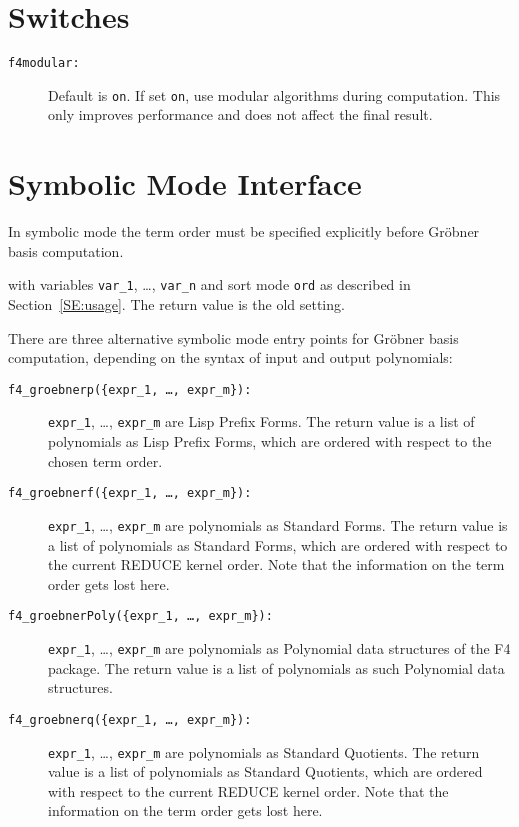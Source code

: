 \documentclass{article}
\newcommand{\grobner}{Gr\"obner}
\newcommand{\code}[1]{\texttt{#1}}
\begin{document}
\section{Switches}
\label{SE:switches}

\begin{description}
\item[\code{f4modular:}] Default is \code{on}. If set \code{on}, use modular algorithms
during computation. This only improves performance and does not affect the final result.
\end{description}

\section{Symbolic Mode Interface}

In symbolic mode the term order must be specified explicitly before \grobner{} basis computation.
%
\begin{description}\sloppy
\item[\code{torder(\{\{'list, var\_1, \ldots, var\_n\}, ord\}):}] with variables \code{var\_1},
\dots, \code{var\_n} and sort mode \code{ord} as described in Section~\ref{SE:usage}. The return
value is the old setting.
\end{description}

There are three alternative symbolic mode entry points for \grobner{} basis computation, depending
on the syntax of input and output polynomials:
\begin{description}
\item[\code{f4\_groebnerp(\{expr\_1, \ldots, expr\_m\}):}] \code{expr\_1}, \dots, \code{expr\_m} are
Lisp Prefix Forms. The return value is a list of polynomials as Lisp Prefix Forms, which are ordered
with respect to the chosen term order.
%
\item[\code{f4\_groebnerf(\{expr\_1, \ldots, expr\_m\}):}] \code{expr\_1}, \dots, \code{expr\_m} are
polynomials as Standard Forms. The return value is a list of polynomials as Standard Forms, which
are ordered with respect to the current REDUCE kernel order. Note that the information on the term
order gets lost here.
%
\item[\code{f4\_groebnerPoly(\{expr\_1, \ldots, expr\_m\}):}] \code{expr\_1}, \dots, \code{expr\_m}
are polynomials as Polynomial data structures of the F4 package. The return value is a list of
polynomials as such Polynomial data structures.
%
\item[\code{f4\_groebnerq(\{expr\_1, \ldots, expr\_m\}):}] \code{expr\_1}, \dots, \code{expr\_m} are
polynomials as Standard Quotients. The return value is a list
of polynomials as Standard Quotients, which are ordered with respect to the current REDUCE kernel
order. Note that the information on the term order gets lost here.
\end{description}
%
\end{document}
